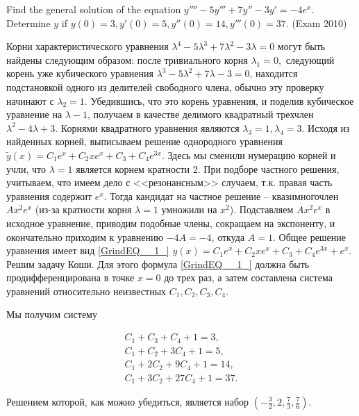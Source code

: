 \begin{problem}
Find the general solution of the equation $y''''-5y'''+7y''-3y'=-4e^{x} $. Determine $y$ if $y(0)=3, y'(0)=5, y''(0)=14, y'''(0)=37.$ (Exam 2010)
\end{problem}

\begin{solution}
Корни характеристического уравнения $\lambda ^{4} -5\lambda ^{3} +7\lambda ^{2} -3\lambda =0$ могут быть найдены следующим образом: после тривиального корня $\lambda _{1} =0, $ следующий корень уже кубического уравнения $\lambda ^{3} -5\lambda ^{2} +7\lambda -3=0$, находится подстановкой одного из делителей свободного члена, обычно эту проверку начинают с $\lambda _{2} =1$. Убедившись, что это корень уравнения, и поделив кубическое уравнение на $\lambda -1$, получаем в качестве делимого квадратный трехчлен $\lambda ^{2} -4\lambda +3$. Корнями квадратного уравнения являются $\lambda _{3} =1, \lambda _{4} =3$. Исходя из найденных корней, выписываем решение однородного уравнения $\tilde{y}(x)=C_{1} e^{x} +C_{2} xe^{x} +C_{3} +C_{4} e^{3x} $. Здесь мы сменили нумерацию корней и учли, что $\lambda =1$ является корнем кратности 2. При подборе частного решения, учитываем, что имеем дело с <<резонансным>> случаем, т.к. правая часть уравнения  содержит $e^{x} $. Тогда кандидат на частное решение -- квазимногочлен $Ax^{2} e^{x} $ (из-за кратности корня $\lambda =1$ умножили на $x^{2} $). Подставляем $Ax^{2} e^{x} $ в исходное уравнение, приводим подобные члены, сокращаем на экспоненту, и окончательно приходим к уравнению $-4A=-4$, откуда $A=1$. Общее решение уравнения  имеет вид \eqref{GrindEQ__1_} $y(x)=C_{1} e^{x} +C_{2} xe^{x} +C_{3} +C_{4} e^{3x} +e^{x} $. Решим задачу Коши. Для этого формула \eqref{GrindEQ__1_} должна быть продифференцирована в точке $x=0$ до трех раз, а затем составлена система уравнений относительно неизвестных $C_{1} , C_{2} , C_{3} , C_{4} $.

Мы получим систему

\[\begin{array}{c} {C_{1} +C_{3} +C_{4} +1=3,} \\ {C_{1} +C_{2} +3C_{4} +1=5,} \\ {C_{1} +2C_{2} +9C_{4} +1=14,} \\ {C_{1} +3C_{2} +27C_{4} +1=37.} \end{array}\] 

Решением которой, как можно убедиться, является набор $(-\frac{3}{2} ,2,\frac{7}{3} ,\frac{7}{6} )$.
\end{solution}

